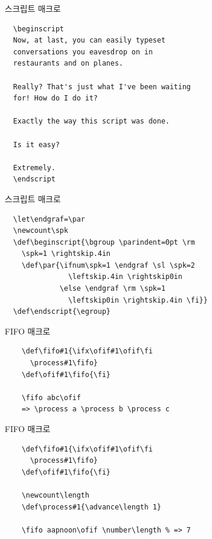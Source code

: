 \documentclass{beamer}
\begin{document}
%
\begin{frame}[fragile]{스크립트 매크로}
  \begin{verbatim}
  \beginscript
  Now, at last, you can easily typeset
  conversations you eavesdrop on in
  restaurants and on planes.
  
  Really? That's just what I've been waiting
  for! How do I do it?
  
  Exactly the way this script was done.
  
  Is it easy?
  
  Extremely.
  \endscript
  \end{verbatim}
\end{frame}


%
\begin{frame}[fragile]{스크립트 매크로}
  \begin{verbatim}
  \let\endgraf=\par
  \newcount\spk
  \def\beginscript{\bgroup \parindent=0pt \rm
    \spk=1 \rightskip.4in
    \def\par{\ifnum\spk=1 \endgraf \sl \spk=2
               \leftskip.4in \rightskip0in
             \else \endgraf \rm \spk=1
               \leftskip0in \rightskip.4in \fi}}
  \def\endscript{\egroup}
  \end{verbatim}
\end{frame}


%
\begin{frame}[fragile]{FIFO 매크로}
  \begin{verbatim}
    \def\fifo#1{\ifx\ofif#1\ofif\fi
      \process#1\fifo}
    \def\ofif#1\fifo{\fi}

    \fifo abc\ofif
    => \process a \process b \process c
  \end{verbatim}
\end{frame}


%
\begin{frame}[fragile]{FIFO 매크로}
  \begin{verbatim}
    \def\fifo#1{\ifx\ofif#1\ofif\fi
      \process#1\fifo}
    \def\ofif#1\fifo{\fi}

    \newcount\length
    \def\process#1{\advance\length 1}

    \fifo aapnoon\ofif \number\length % => 7
  \end{verbatim}
\end{frame}
\end{document}
